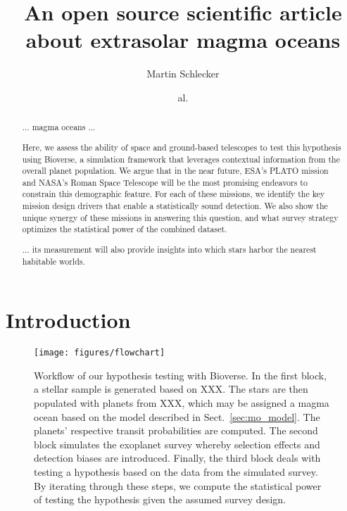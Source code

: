 \documentclass[twocolumn]{aastex631}
\begin{document}
\title{An open source scientific article about extrasolar magma oceans}

\author[0000-0001-8355-2107]{Martin Schlecker}
\author{al.}


\begin{abstract}
    $\ldots$ magma oceans $\ldots$

    Here, we assess the ability of space and ground-based telescopes to test this hypothesis using Bioverse, a simulation framework that leverages contextual information from the overall planet population.
    We argue that in the near future, ESA's PLATO mission and NASA's Roman Space Telescope will be the most promising endeavors to constrain this demographic feature.
    For each of these missions, we identify the key mission design drivers that enable a statistically sound detection.
    We also show the unique synergy of these missions in answering this question, and what survey strategy optimizes the statistical power of the combined dataset.

    $\ldots$ its measurement will also provide insights into which stars harbor the nearest habitable worlds.
\end{abstract}

\section{Introduction}
\Blindtext[4]

\begin{figure*}
    \begin{centering}
        \texttt{[image: figures/flowchart]}
        \caption{Workflow of our hypothesis testing with Bioverse. In the first block, a stellar sample is generated based on XXX. The stars are then populated with planets from XXX, which may be assigned a magma ocean based on the model described in Sect.~\ref{sec:mo_model}. The planets' respective transit probabilities are computed. The second block simulates the exoplanet survey whereby selection effects and detection biases are introduced. Finally, the third block deals with testing a hypothesis based on the data from the simulated survey. By iterating through these steps, we compute the statistical power of testing the hypothesis given the assumed survey design.}
        \label{fig:flowchart}
    \end{centering}
\end{figure*}
\end{document}
